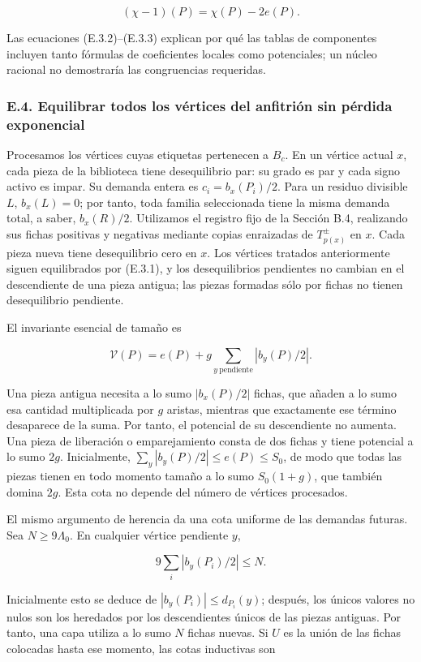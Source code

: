 \documentclass[spanish,11pt,a4paper]{article}
\begin{document}
\[(\chi-1)(P)=\chi(P)-2e(P).
\tag{E.3.3}\]

Las ecuaciones (E.3.2)--(E.3.3) explican por qué las tablas de componentes incluyen tanto fórmulas de coeficientes locales como potenciales; un núcleo racional no demostraría las congruencias requeridas.

\subsubsection{E.4. Equilibrar todos los vértices del anfitrión sin pérdida exponencial}\label{e.4.-equilibrar-todos-los-vuxe9rtices-del-anfitriuxf3n-sin-puxe9rdida-exponencial}

Procesamos los vértices cuyas etiquetas pertenecen a \(B_c\). En un vértice actual \(x\), cada pieza de la biblioteca tiene desequilibrio par: su grado es par y cada signo activo es impar. Su demanda entera es \(c_i=b_x(P_i)/2\). Para un residuo divisible \(L\), \(b_x(L)=0\); por tanto, toda familia seleccionada tiene la misma demanda total, a saber, \(b_x(R)/2\). Utilizamos el registro fijo de la Sección B.4, realizando sus fichas positivas y negativas mediante copias enraizadas de \(T_{p(x)}^\pm\) en \(x\). Cada pieza nueva tiene desequilibrio cero en \(x\). Los vértices tratados anteriormente siguen equilibrados por (E.3.1), y los desequilibrios pendientes no cambian en el descendiente de una pieza antigua; las piezas formadas sólo por fichas no tienen desequilibrio pendiente.

El invariante esencial de tamaño es

\[\mathcal V(P)=e(P)+g\sum_{y\ \mathrm{pendiente}}|b_y(P)/2|.
\tag{E.4.1}\]

Una pieza antigua necesita a lo sumo \(|b_x(P)/2|\) fichas, que añaden a lo sumo esa cantidad multiplicada por \(g\) aristas, mientras que exactamente ese término desaparece de la suma. Por tanto, el potencial de su descendiente no aumenta. Una pieza de liberación o emparejamiento consta de dos fichas y tiene potencial a lo sumo \(2g\). Inicialmente, \(\sum_y|b_y(P)/2|\le e(P)\le S_0\), de modo que todas las piezas tienen en todo momento tamaño a lo sumo \(S_0(1+g)\), que también domina \(2g\). Esta cota no depende del número de vértices procesados.

El mismo argumento de herencia da una cota uniforme de las demandas futuras. Sea \(N\ge9\Lambda_0\). En cualquier vértice pendiente \(y\),

\[9\sum_i|b_y(P_i)/2|\le N.
\tag{E.4.2}\]

Inicialmente esto se deduce de \(|b_y(P_i)|\le d_{P_i}(y)\); después, los únicos valores no nulos son los heredados por los descendientes únicos de las piezas antiguas. Por tanto, una capa utiliza a lo sumo \(N\) fichas nuevas. Si \(U\) es la unión de las fichas colocadas hasta ese momento, las cotas inductivas son
\end{document}
